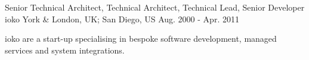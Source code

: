 \begin{cventries}

\cvexpentry
{Senior Technical Architect, Technical Architect, Technical Lead, Senior Developer} %
{ioko} %
{York \& London, UK; San Diego, US} %
{Aug. 2000 - Apr. 2011} %
{
\begin{cvitemstitle}
\item {ioko are a start-up specialising in bespoke software development, managed services and system integrations.}
\end{cvitemstitle}
}
{ %
\begin{cvitems}
\end{cvitems}
}


\end{cventries}
